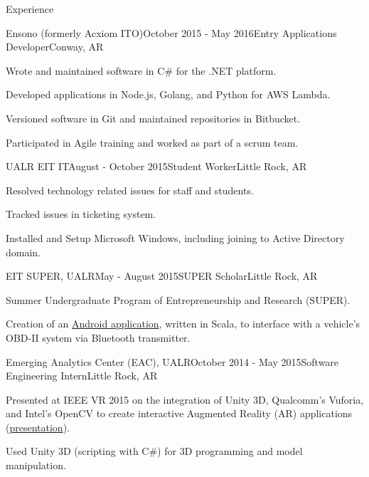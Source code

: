 \documentclass{resume} %
\begin{document}
\begin{rSection}{Experience}

\begin{rSubsection}{Ensono (formerly Acxiom ITO)}{October 2015 - May 2016}{Entry Applications Developer}{Conway, AR}

	\item Wrote and maintained software in C\# for the .NET platform.
	\item Developed applications in Node.js, Golang, and Python for AWS Lambda.
	\item Versioned software in Git and maintained repositories in Bitbucket.
	\item Participated in Agile training and worked as part of a scrum team.
\end{rSubsection}

\begin{rSubsection}{UALR EIT IT}{August - October 2015}{Student Worker}{Little Rock, AR}

	\item Resolved technology related issues for staff and students.
	\item Tracked issues in ticketing system.
	\item Installed and Setup Microsoft Windows, including joining to Active Directory domain.
\end{rSubsection}

\begin{rSubsection}{EIT SUPER, UALR}{May - August 2015}{SUPER Scholar}{Little Rock, AR}

	\item Summer Undergraduate Program of Entrepreneurship and Research (SUPER).
	\item Creation of an \href{http://github.com/cptaffe/flamethrower}{Android application}, written in Scala, to interface with a vehicle's OBD-II system via Bluetooth transmitter.
\end{rSubsection}

\begin{rSubsection}{Emerging Analytics Center (EAC), UALR}{October 2014 - May 2015}{Software Engineering Intern}{Little Rock, AR}
	\item Presented at IEEE VR 2015 on the integration of Unity 3D, Qualcomm's Vuforia, and Intel's OpenCV to create interactive Augmented Reality (AR) applications (\href{http://byteflame.org/ieee_vr/}{presentation}{}).
	\item Used Unity 3D (scripting with C\#) for 3D programming and model manipulation.
\end{rSubsection}


\end{rSection}
\end{document}
